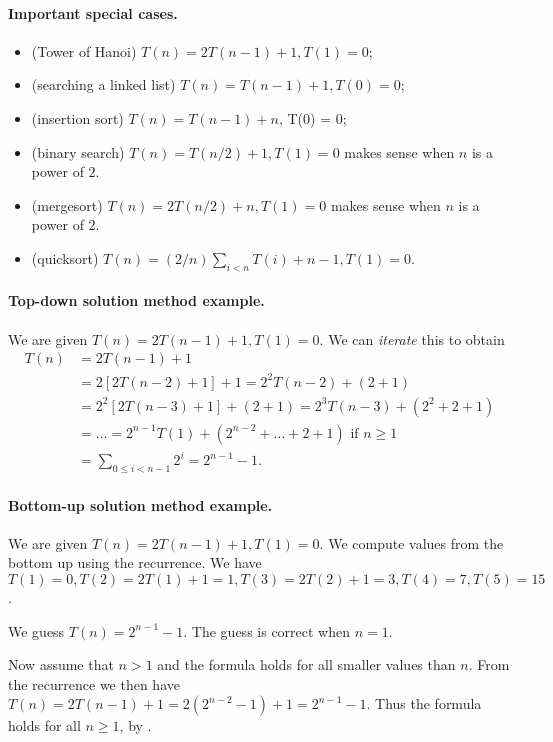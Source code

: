 \paragraph{Important special cases.}
\begin{itemize}
\item (Tower of Hanoi) $T(n) = 2 T(n - 1) + 1, T(1) = 0$;
\item (searching a linked list) $T(n) = T(n - 1) + 1, T(0) = 0$;
\item (insertion sort) $T(n) = T(n-1) + n$, T(0) = 0;
\item (binary search) $T(n) = T(n/2) + 1, T(1) = 0$ makes sense when $n$ is 
a power of $2$. 
\item (mergesort) $T(n) = 2T(n/2) + n, T(1) = 0$ makes sense when $n$ is 
a power of $2$.
\item (quicksort) $T(n) = (2/n)\sum_{i<n} T(i) + n-1, T(1) = 0$.
\end{itemize}

\paragraph{Top-down solution method example.}
\begin{Example}
We are given $T(n) = 2 T(n - 1) + 1, T(1) = 0$. We can \emph{iterate} this to obtain 
\begin{align*}
T(n) & = 2 T(n - 1) + 1  \\
& = 2 [2 T(n - 2) + 1] + 1 = 2^2 T(n-2) + (2 + 1) \\
& = 2^2 [2T(n - 3) + 1] + (2 + 1) = 2^3 T(n - 3) + (2^2 + 2+ 1)  \\ 
& = \dots = 2^{n-1} T(1) + (2^{n-2} + \dots + 2 + 1)  \text{ if $n \geq 1$} \\
& = \sum_{0\leq i < n-1} 2^i = 2^{n-1} - 1.
\end{align*}
\end{Example}

\paragraph{Bottom-up solution method example.}
\begin{Example}
We are given $T(n) = 2 T(n - 1) + 1, T(1) = 0$. We compute values from the
 bottom up using the recurrence. We have $T(1) = 0, T(2) = 2T(1) + 1 = 1, T(3) = 2T(2) + 1 = 3, T(4) = 7, 
T(5) = 15$. 

We guess $T(n) = 2^{n-1} - 1$. The guess is correct when $n = 1$. 

Now assume that $n > 1$ and the formula holds 
for all smaller values than $n$. From the recurrence we then have 
$T(n) = 2T(n-1) + 1 = 2(2^{n-2} - 1) + 1 = 2^{n-1} - 1$. 
Thus the formula holds for all $n\geq 1$, by .
\end{Example}


